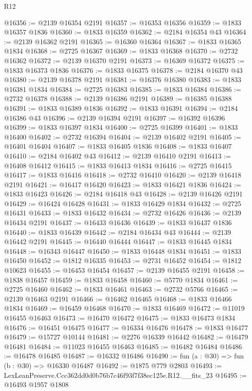 \begin{lexlean}{R12}
\begin{coremodule}
@16356 := @2139 @16354 @2191
@16357 := @16353 @16356
@16359 := @1833 @16357 @1836
@16360 := @1833 @16359
@16362 := @2184 @16354 @43
@16364 := @2139 @16362 @2191
@16365 := @16360 @16364
@16367 := @1833 @16365 @1834
@16368 := @2725 @16367
@16369 := @1833 @16368
@16370 := @2732 @16362
@16372 := @2139 @16370 @2191
@16373 := @16369 @16372
@16375 := @1833 @16373 @1836
@16376 := @1833 @16375
@16378 := @2184 @16370 @43
@16380 := @2139 @16378 @2191
@16381 := @16376 @16380
@16383 := @1833 @16381 @1834
@16384 := @2725 @16383
@16385 := @1833 @16384
@16386 := @2732 @16378
@16388 := @2139 @16386 @2191
@16389 := @16385 @16388
@16391 := @1833 @16389 @1836
@16392 := @1833 @16391
@16394 := @2184 @16386 @43
@16396 := @2139 @16394 @2191
@16397 := @16392 @16396
@16399 := @1833 @16397 @1834
@16400 := @2725 @16399
@16401 := @1833 @16400
@16402 := @2732 @16394
@16404 := @2139 @16402 @2191
@16405 := @16401 @16404
@16407 := @1833 @16405 @1836
@16408 := @1833 @16407
@16410 := @2184 @16402 @43
@16412 := @2139 @16410 @2191
@16413 := @16408 @16412
@16415 := @1833 @16413 @1834
@16416 := @2725 @16415
@16417 := @1833 @16416
@16418 := @2732 @16410
@16420 := @2139 @16418 @2191
@16421 := @16417 @16420
@16423 := @1833 @16421 @1836
@16424 := @1833 @16423
@16426 := @2184 @16418 @43
@16428 := @2139 @16426 @2191
@16429 := @16424 @16428
@16431 := @1833 @16429 @1834
@16432 := @2725 @16431
@16433 := @1833 @16432
@16434 := @2732 @16426
@16436 := @2139 @16434 @2191
@16437 := @16433 @16436
@16439 := @1833 @16437 @1836
@16440 := @1833 @16439
@16442 := @2184 @16434 @43
@16444 := @2139 @16442 @2191
@16445 := @16440 @16444
@16447 := @1833 @16445 @1834
@16448 := @16343 @16447
@16450 := @1833 @16448 @1834
@16451 := @1833 @16450
@16452 := @1812 @16335
@16453 := @2731 @16452
@16454 := @1812 @10623
@16455 := @16453 @16454
@16457 := @2139 @16455 @2191
@16458 := @1838 @16457
@16459 := @1833 @16458
@16460 := @5770 @1834
@16461 := @2725 @16460
@16462 := @1833 @16461
@16463 := @2732 @5766
@16465 := @2139 @16463 @2191
@16466 := @16462 @16465
@16468 := @1833 @16466 @1834
@16469 := @16459 @16468
@16470 := @1833 @16469
@16472 := @11019 @16455 @16463
@16473 := @16470 @16472
@16475 := @1833 @16473 @1834
@16476 := @16451 @16475
@16477 := @16334 @16476
@16478 := @1833 @16477
@16479 := @15727 @10144
@16481 := @2276 @16339 @16442
@16482 := @16479 @16481
@16484 := @11023 @16455 @16463
@16485 := @16482 @16484
@16486 := @16478 @16485
@16487 := @16332 @16486
@16490 := fun (a : @30) => fun (b : @30) => @16330 @16487
@16492 := @1875 @779 @2803
@16493 := LexLeanPreserve.Ccc362dd0d0b76b7c46f93f7f38ec125e.R12.__fits_23
@16495 := @16493 @1957 @1808

\end{coremodule}
\end{lexlean}
